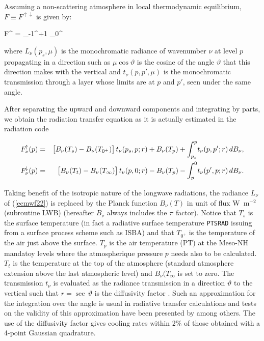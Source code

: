 %

Assuming a non-scattering atmosphere in local thermodynamic equilibrium,
$F \equiv F^{\!\uparrow\!\downarrow}$ is given by:

\medskip
\be
F^{\!\uparrow\!\downarrow} = \int_{-1}^{+1} \int_0^
\label{ecmwf22}
\ee
\medskip

where $L_{\nu}(p_s,\mu)$ is the monochromatic radiance of wavenumber
$\nu$ at level $p$ propagating in a direction such as $\mu \cos\vartheta $ is the cosine of the angle
$\vartheta $ that this direction makes with the vertical and
$t_{\nu}(p,p',\mu)$ is the monochromatic transmission through a layer
whose limits are at $p$ and $p'$, seen under the same angle.

After separating the upward and downward components and integrating by parts,
we obtain the radiation transfer equation as it is actually estimated in the
radiation code


\medskip
\begin{eqnarray}\label{ecmwf23}
F_{\nu}^{\!\uparrow}(p) &=&
\bigl[B_{\nu}(T_s) - B_{\nu}(T_{0^{+}})\bigr] \, t_{\nu}(p_s,p;r)
+ B_{\nu}(T_p) + \int_{p_s}^p \! {t_{\nu}(p,p';r) \, dB_{\nu}}, \cr
F_{\nu}^{\!\downarrow}(p) &=&
\bigl[B_{\nu}(T_t) - B_{\nu}(T_{\infty})\bigr] \, t_{\nu}(p,0;r)
- B_{\nu}(T_p) - \int_{p}^0 \! {t_{\nu}(p',p;r) \, dB_{\nu}}.
\end{eqnarray}
\medskip

Taking benefit of the isotropic nature of the longwave radiations,
the radiance $L_{\nu}$ of (\ref{ecmwf22}) is replaced by the Planck function
$B_{\nu}(T)$ in unit of flux W~m$^{-2}$ (subroutine LWB) (hereafter
$B_{\nu}$ always includes the $\pi$ factor).  Notice that $T_s$ is the surface
temperature (in fact a radiative surface temperature {\tt PTSRAD} issuing from
a surface process scheme such as ISBA) and that $T_{0^{+}}$ is the temperature
of the air just above the surface. $T_{p}$ is the air temperature (PT) at the
Meso-NH mandatoy levels where the atmospherique pressure $p$ needs also
to be calculated. $T_t$ is the temperature at the top of the atmosphere
(standard atmosphere extension above the last atmospheric level) and
$B_{\nu}(T_{\infty}$ is set to zero. The transmission $t_{\nu}$ is evaluated as
the radiance transmission in a direction $\vartheta $ to the vertical such
that $r = \sec \, \vartheta $ is the diffusivity factor \citep{Elsasser1942}.
Such an approximation for the integration over the angle is usual in
radiative transfer calculations and tests on the validity of this
approximation have been presented by \citet{Rodgers1966} among
others.  The use of the diffusivity factor gives cooling rates within
2\% of those obtained with a 4-point Gaussian quadrature.


